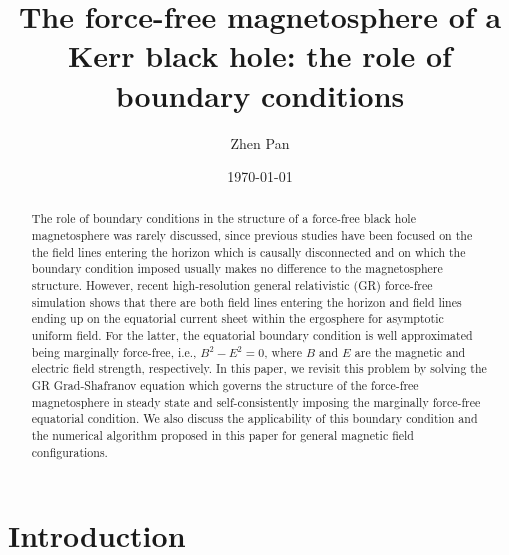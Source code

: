 \documentclass[aps,prd,reprint,nofootinbib, superscriptaddress]{revtex4-1}
\begin{document}
\title{The force-free magnetosphere of a Kerr black hole: the role of boundary conditions}
\author{Zhen Pan}

\date{\today}

\begin{abstract}
    The role of boundary conditions in the structure of
    a force-free black hole magnetosphere was rarely discussed, since previous studies have been focused on the
    the field lines entering the horizon which is causally disconnected and on which the boundary
    condition imposed usually makes no difference to the magnetosphere structure. However,
    recent high-resolution general relativistic (GR) force-free simulation shows that there are both
    field lines entering the horizon and field lines ending up on the equatorial current sheet
    within the ergosphere for asymptotic uniform field. For the latter, the equatorial boundary
    condition is well approximated being marginally force-free, i.e., $B^2-E^2=0$, where $B$ and
    $E$ are the magnetic and electric field strength, respectively. In this paper, we revisit this
    problem by solving the GR Grad-Shafranov equation which governs the structure of
    the force-free magnetosphere in steady state and self-consistently imposing the marginally force-free equatorial
    condition. We also discuss the applicability of this boundary condition and the numerical algorithm proposed
    in this paper for general magnetic field configurations.
\end{abstract}


\maketitle

\section{Introduction}
\end{document}
